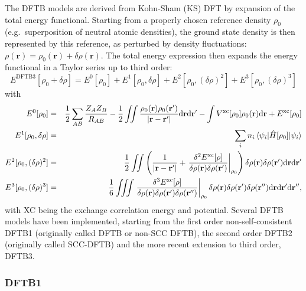\documentclass{revtex4-1}
\begin{document}
The DFTB models are derived from Kohn-Sham (KS) DFT\cite{Kohn1965}
by expansion of the total energy functional.  Starting from a properly
chosen reference density $\rho_0$ (e.g.\ superposition of neutral atomic
densities), the ground state density is then represented by this reference, as 
perturbed by density fluctuations:
$\rho(\mathbf{r}) = \rho_0(\mathbf{r}) +\delta\rho(\mathbf{r})$.  The total
energy expression then expands the energy functional in a Taylor series up to third
order:
\begin{equation}
  E^{\text{DFTB3}}[\rho_0+\delta\rho] = E^0[\rho_0] + E^1[\rho_0,\delta \rho] +
  E^2[\rho_0,(\delta \rho)^2] + E^3[\rho_0,(\delta \rho)^3]
\end{equation}
with
\begin{eqnarray}
  E^0[\rho_0] &=& \frac 12 \sum_{AB} \frac{Z_AZ_B}{R_{AB}} -\frac 12 \iint
  \frac{\rho_0(\mathbf{r})\rho_0(\mathbf{r}')}{|\mathbf{r}-\mathbf{r}'|}
  \mathrm{d}\mathbf{r} \mathrm{d}\mathbf{r}' -\int
  V^{\text{xc}}[\rho_0]\rho_0(\mathbf{r})\text{d}\mathbf{r} +
  E^{\text{xc}}[\rho_0] \nonumber\\ E^1[\rho_0,\delta \rho] &=& \sum_i n_i
  \mel{\psi_i}{\hat{H}[\rho_0]}{\psi_i} \nonumber\\ E^2[\rho_0,(\delta \rho)^2]
  &=& \frac{1}{2} \iint \left( \frac{1}{|\mathbf{r}-\mathbf{r}'|} + \eval{
    \frac{\delta^2E^{\text{xc}}[\rho]}{\delta\rho(\mathbf{r})
      \delta\rho(\mathbf{r}')} }_{\rho_0} \right) \delta\rho(\mathbf{r})
  \delta\rho(\mathbf{r}') \mathrm{d}\mathbf{r} \mathrm{d}\mathbf{r}' \nonumber
  \\ E^3[\rho_0,(\delta \rho)^3] &=& \frac{1}{6} \iiint \eval{
    \frac{\delta^3E^{\text{xc}}[\rho]}{\delta\rho(\mathbf{r})
      \delta\rho(\mathbf{r}') \delta\rho(\mathbf{r}'')} }_{\rho_0}
  \delta\rho(\mathbf{r}) \delta\rho(\mathbf{r}') \delta\rho(\mathbf{r}'')
  \mathrm{d}\mathbf{r} \mathrm{d}\mathbf{r}'
  \mathrm{d}\mathbf{r}'',\label{DFTtaylor}
\end{eqnarray}
with XC being the exchange correlation energy and potential.
%
Several DFTB models have been implemented, starting from the first order
non-self-consistent DFTB1\cite{Seifert1996,Porezag1995} (originally called
DFTB or non-SCC DFTB), the second order DFTB2 (originally called SCC-DFTB)\cite{Elstner1998}
and the more recent extension to third order,
DFTB3.\cite{Elstner2007,Yang2007,Gaus2011,Gaus2012}

\subsubsection{DFTB1}
\end{document}
